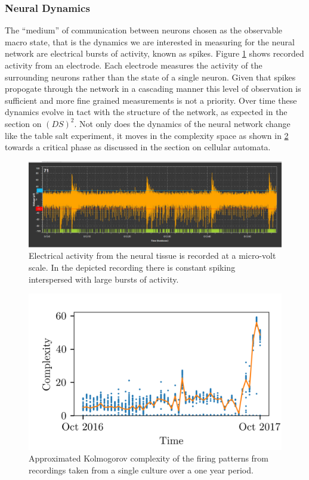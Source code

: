 \subsubsection{Neural Dynamics}
The ``medium'' of communication between neurons chosen as the observable macro
state, that is the dynamics we are interested in measuring for the neural
network are electrical bursts of activity, known as spikes.
Figure \ref{figWave} shows recorded activity from an electrode.
Each electrode measures the activity of the surrounding neurons rather than the
state of a single neuron.
Given that spikes propogate through the network in a cascading manner this
level of observation is sufficient and more fine grained measurements is not a
priority.
Over time these dynamics evolve in tact with the structure of the network, as
expected in the section on $(DS)^2$.
Not only does the dynamics of the neural network change like the table salt
experiment, it moves in the complexity space as shown in \ref{figDopey} towards
a critical phase as discussed in the section on cellular automata.
%
\begin{figure}[h]
  \centering
  \includegraphics[width=1\textwidth]{fig/PacemakerBurst.png}
  \caption{
    Electrical activity from the neural tissue is recorded at a micro-volt
    scale.
    In the depicted recording there is constant spiking interspersed with large
    bursts of activity.
  }
  \label{figWave}
\end{figure}
%
\begin{figure}[h]
  \centering
  \includegraphics[width=1\textwidth]{fig/dopeyComplexity.png}
  \caption{
    Approximated Kolmogorov complexity of the firing patterns from recordings
    taken from a single culture over a one year period.
  }
  \label{figDopey}
\end{figure}
